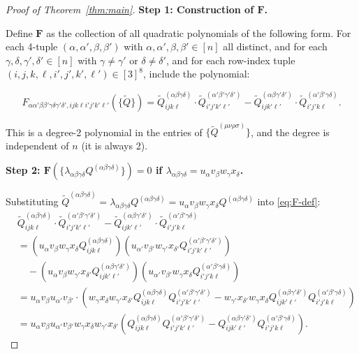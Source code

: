 \documentclass[12pt]{article}
\theoremstyle{definition}
\begin{document}
\begin{proof}[Proof of Theorem~\ref{thm:main}]

\textbf{Step 1: Construction of $\mathbf{F}$.}

Define $\mathbf{F}$ as the collection of all quadratic polynomials of the following form. For each 4-tuple $(\alpha,\alpha',\beta,\beta')$ with $\alpha,\alpha',\beta,\beta'\in[n]$ all distinct, and for each $\gamma,\delta,\gamma',\delta'\in[n]$ with $\gamma\neq\gamma'$ or $\delta\neq\delta'$, and for each row-index tuple $(i,j,k,\ell,i',j',k',\ell')\in[3]^8$, include the polynomial:

\begin{equation}\label{eq:F-def}
F_{\alpha\alpha'\beta\beta'\gamma\delta\gamma'\delta',ijk\ell i'j'k'\ell'}(\{\tilde{Q}\}) = \tilde{Q}^{(\alpha\beta\gamma\delta)}_{ijk\ell}\cdot\tilde{Q}^{(\alpha'\beta'\gamma'\delta')}_{i'j'k'\ell'} - \tilde{Q}^{(\alpha\beta\gamma'\delta')}_{ijk'\ell'}\cdot\tilde{Q}^{(\alpha'\beta'\gamma\delta)}_{i'j'k\ell}.
\end{equation}

This is a degree-2 polynomial in the entries of $\{\tilde{Q}^{(\mu\nu\rho\sigma)}\}$, and the degree is independent of $n$ (it is always 2).

\textbf{Step 2: $\mathbf{F}(\{\lambda_{\alpha\beta\gamma\delta}Q^{(\alpha\beta\gamma\delta)}\}) = 0$ if $\lambda_{\alpha\beta\gamma\delta} = u_\alpha v_\beta w_\gamma x_\delta$.}

Substituting $\tilde{Q}^{(\alpha\beta\gamma\delta)} = \lambda_{\alpha\beta\gamma\delta}Q^{(\alpha\beta\gamma\delta)} = u_\alpha v_\beta w_\gamma x_\delta Q^{(\alpha\beta\gamma\delta)}$ into \eqref{eq:F-def}:
\begin{align*}
&\tilde{Q}^{(\alpha\beta\gamma\delta)}_{ijk\ell}\cdot\tilde{Q}^{(\alpha'\beta'\gamma'\delta')}_{i'j'k'\ell'} - \tilde{Q}^{(\alpha\beta\gamma'\delta')}_{ijk'\ell'}\cdot\tilde{Q}^{(\alpha'\beta'\gamma\delta)}_{i'j'k\ell}\\
&= (u_\alpha v_\beta w_\gamma x_\delta Q^{(\alpha\beta\gamma\delta)}_{ijk\ell})(u_{\alpha'} v_{\beta'} w_{\gamma'} x_{\delta'} Q^{(\alpha'\beta'\gamma'\delta')}_{i'j'k'\ell'})\\
&\quad - (u_\alpha v_\beta w_{\gamma'} x_{\delta'} Q^{(\alpha\beta\gamma'\delta')}_{ijk'\ell'})(u_{\alpha'} v_{\beta'} w_\gamma x_\delta Q^{(\alpha'\beta'\gamma\delta)}_{i'j'k\ell})\\
&= u_\alpha v_\beta u_{\alpha'} v_{\beta'}\cdot(w_\gamma x_\delta w_{\gamma'} x_{\delta'} Q^{(\alpha\beta\gamma\delta)}_{ijk\ell}Q^{(\alpha'\beta'\gamma'\delta')}_{i'j'k'\ell'} - w_{\gamma'} x_{\delta'} w_\gamma x_\delta Q^{(\alpha\beta\gamma'\delta')}_{ijk'\ell'}Q^{(\alpha'\beta'\gamma\delta)}_{i'j'k\ell})\\
&= u_\alpha v_\beta u_{\alpha'} v_{\beta'} w_\gamma x_\delta w_{\gamma'} x_{\delta'}(Q^{(\alpha\beta\gamma\delta)}_{ijk\ell}Q^{(\alpha'\beta'\gamma'\delta')}_{i'j'k'\ell'} - Q^{(\alpha\beta\gamma'\delta')}_{ijk'\ell'}Q^{(\alpha'\beta'\gamma\delta)}_{i'j'k\ell}).
\end{align*}


\end{proof}
\end{document}
